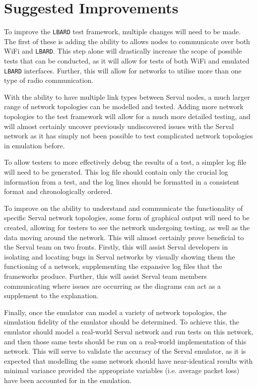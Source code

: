 \section{Suggested Improvements}
To improve the \texttt{LBARD} test framework, multiple changes will need to be made.
The first of these is adding the ability to allows nodes to communicate over both WiFi and \texttt{LBARD}.
This step alone will drastically increase the scope of possible tests that can be conducted, as it will allow for tests of both WiFi and emulated \texttt{LBARD} interfaces.
Further, this will allow for networks to utilise more than one type of radio communication.

With the ability to have multiple link types between Serval nodes, a much larger range of network topologies can be modelled and tested.
Adding more network topologies to the test framework will allow for a much more detailed testing, and will almost certainly uncover previously undiscovered issues with the Serval network as it has simply not been possible to test complicated network topologies in emulation before.

To allow testers to more effectively debug the results of a test, a simpler log file will need to be generated.
This log file should contain only the crucial log information from a test, and the log lines should be formatted in a consistent format and chronologically ordered.

To improve on the ability to understand and communicate the functionality of specific Serval network topologies, some form of graphical output will need to be created, allowing for testers to see the network undergoing testing, as well as the data moving around the network.
This will almost certainly prove beneficial to the Serval team on two fronts. 
Firstly, this will assist Serval developers in isolating and locating bugs in Serval networks by visually showing them the functioning of a network, supplementing the expansive log files that the frameworks produce.
Further, this will assist Serval team members communicating where issues are occurring as the diagrams can act as a supplement to the explanation.

Finally, once the emulator can model a variety of network topologies, the simulation fidelity of the emulator should be determined.
To achieve this, the emulator should model a real-world Serval network and run tests on this network, and then those same tests should be run on a real-world implementation of this network.
This will serve to validate the accuracy of the Serval emulator, as it is expected that modelling the same network should have near-identical results with minimal variance provided the appropriate variables (i.e. average packet loss) have been accounted for in the emulation.

